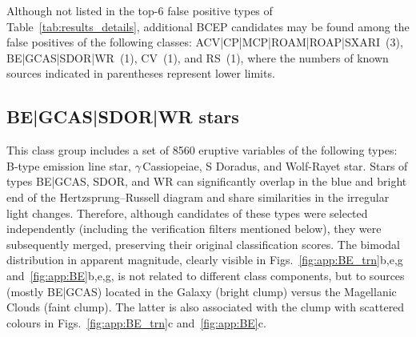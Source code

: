 \documentclass[longauth]{aa}
\begin{document}
Although not listed in the top-6 false positive types of Table~\ref{tab:results_details}, additional BCEP candidates may be found among the false positives of the following classes: ACV|CP|MCP|ROAM|ROAP|SXARI~(3), BE|GCAS|SDOR|WR~(1), CV~(1), and RS~(1), where the numbers of known sources indicated in parentheses represent lower limits.


\subsection{BE|GCAS|SDOR|WR stars\label{ssec:be}}

This class group includes a set of 8560 eruptive variables of the following types: B-type emission line star, $\gamma$\,Cassiopeiae, S Doradus, and Wolf-Rayet star.
Stars of types BE|GCAS, SDOR, and WR can significantly overlap in the blue and bright end of the Hertzsprung--Russell diagram and share similarities in the irregular light changes. Therefore, although candidates of these types were selected independently (including the verification filters mentioned below), they were subsequently merged, preserving their original classification scores.
The bimodal distribution in apparent magnitude, clearly visible in Figs.~\ref{fig:app:BE_trn}b,e,g and~\ref{fig:app:BE}b,e,g, is not related to different class components, but to sources (mostly BE|GCAS) located in the Galaxy (bright clump) versus the Magellanic Clouds (faint clump). The latter is also associated with the clump with scattered colours in Figs.~\ref{fig:app:BE_trn}c and~\ref{fig:app:BE}c.
\end{document}
